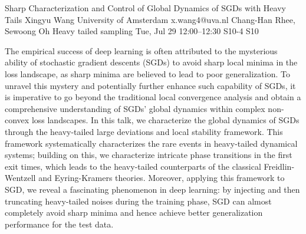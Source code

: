 \begin{talk}
  {Sharp Characterization and Control of Global Dynamics of SGDs with Heavy Tails}%
  {Xingyu Wang}%
  {University of Amsterdam}%
  {x.wang4@uva.nl}%
  {Chang-Han Rhee, Sewoong Oh}%
  {Heavy tailed sampling}%
  {Tue, Jul 29 12:00–12:30}%
  {S10-4}%
  {S10}%
				
			
The empirical success of deep learning is often attributed to the mysterious ability of stochastic gradient descents (SGDs) to avoid sharp local minima in the loss landscape, as sharp minima are believed to lead to poor generalization. To unravel this mystery and potentially further enhance such capability of SGDs, it is imperative to go beyond the traditional local convergence analysis and obtain a comprehensive understanding of SGDs' global dynamics within complex non-convex loss landscapes. In this talk, we characterize the global dynamics of SGDs through the heavy-tailed large deviations and local stability framework. This framework systematically characterizes the rare events in heavy-tailed dynamical systems; building on this, we characterize intricate phase transitions in the first exit times, which leads to the heavy-tailed counterparts of the classical Freidlin-Wentzell and Eyring-Kramers theories. Moreover, applying this framework to SGD, we reveal a fascinating phenomenon in deep learning: by injecting and then truncating heavy-tailed noises during the training phase, SGD can almost completely avoid sharp minima and hence achieve better generalization performance for the test data.



\end{talk}

